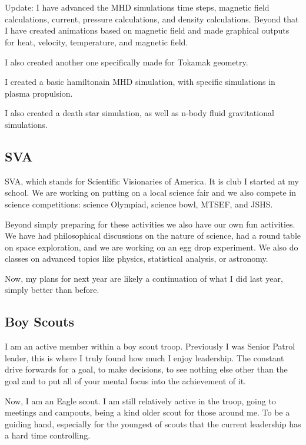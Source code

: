 \\
\\
\par Update: I have advanced the MHD simulations time steps, magnetic field calculations, current, pressure calculations, and density calculations. Beyond that I have created animations based on magnetic field and made graphical outputs for heat, velocity, temperature, and magnetic field.
\par I also created another one specifically made for Tokamak geometry.
\par I created a basic hamiltonain MHD simulation, with specific simulations in plasma propulsion.
\par I also created a death star simulation, as well as n-body fluid gravitational simulations.
\subsection{SVA}
\par SVA, which stands for Scientific Visionaries of America. It is club I started at my school. We are working on putting on a local science fair and we  also compete in science competitions: science Olympiad, science bowl, MTSEF, and JSHS.
\par Beyond simply preparing for these activities we also have our own fun activities. We have had philosophical discussions on the nature of science, had a round table on space exploration, and we are working on an egg drop experiment. We also do classes on advanced topics like physics, statistical analysis, or astronomy.
\par Now, my plans for next year are likely a continuation of what I did last year, simply better than before.
\subsection{Boy Scouts}
\par I am an active member within a boy scout troop. Previously I was Senior Patrol leader, this is where I truly found how much I enjoy leadership. The constant drive forwards for a goal, to  make decisions, to see nothing else other than the goal and to put all of your mental focus into the achievement of it.
\par Now, I am an Eagle scout. I am still relatively active in the troop, going to meetings and campouts, being a kind older scout for those around me. To be a guiding hand, especially for the youngest of scouts that the current leadership has a hard time controlling.

